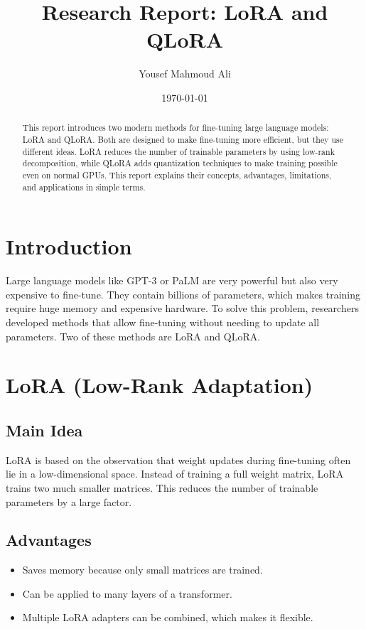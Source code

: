 \documentclass[11pt]{article}
\title{Research Report: LoRA and QLoRA}
\author{Yousef Mahmoud Ali}
\date{\today}
\begin{document}
\maketitle

\begin{abstract}
This report introduces two modern methods for fine-tuning large language models: LoRA and QLoRA. 
Both are designed to make fine-tuning more efficient, but they use different ideas. 
LoRA reduces the number of trainable parameters by using low-rank decomposition, 
while QLoRA adds quantization techniques to make training possible even on normal GPUs. 
This report explains their concepts, advantages, limitations, and applications in simple terms.
\end{abstract}

\section{Introduction}
Large language models like GPT-3 or PaLM are very powerful but also very expensive to fine-tune. 
They contain billions of parameters, which makes training require huge memory and expensive hardware. 
To solve this problem, researchers developed methods that allow fine-tuning without needing to update all parameters. 
Two of these methods are LoRA and QLoRA.

\section{LoRA (Low-Rank Adaptation)}
\subsection{Main Idea}
LoRA is based on the observation that weight updates during fine-tuning often lie in a low-dimensional space. 
Instead of training a full weight matrix, LoRA trains two much smaller matrices. 
This reduces the number of trainable parameters by a large factor.

\subsection{Advantages}
\begin{itemize}
    \item Saves memory because only small matrices are trained.
    \item Can be applied to many layers of a transformer.
    \item Multiple LoRA adapters can be combined, which makes it flexible.
\end{itemize}
\end{document}
